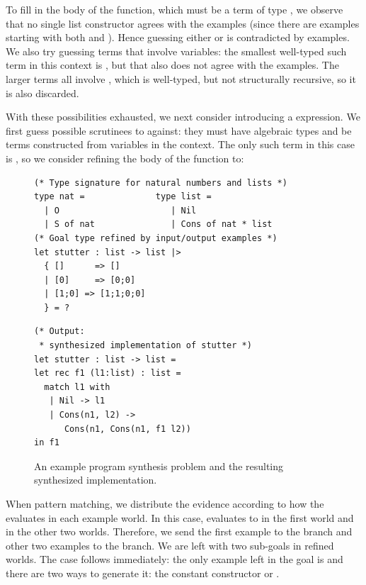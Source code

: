 To fill in the body of the function, which must be a term of type
, we observe that no single list constructor agrees with the
examples (since there are examples starting with both  and
).  Hence guessing either  or
 is contradicted by examples.
We also try guessing terms that involve variables:
the smallest well-typed such term in this context is , but that also
does not agree with the examples.  The larger terms all involve
, which is well-typed, but not structurally recursive, so it
is also discarded.

With these possibilities exhausted, we next consider introducing a
 expression.  We first guess possible scrutinees to
 against: they must have algebraic types and be terms
constructed from variables in the context.  The only such term in this
case is , so we consider refining the body of the function to:

\begin{figure}[t]

\begin{minipage}[t]{3.5in}
{\small
\begin{lstlisting}
(* Type signature for natural numbers and lists *)
type nat =              type list = 
  | O                      | Nil
  | S of nat               | Cons of nat * list
(* Goal type refined by input/output examples *)
let stutter : list -> list |>
  { []      => []
  | [0]     => [0;0]
  | [1;0] => [1;1;0;0]
  } = ?
\end{lstlisting}
}
\end{minipage}
\quad
\begin{minipage}[t]{3in}
{\small
\begin{lstlisting}
(* Output: 
 * synthesized implementation of stutter *)
let stutter : list -> list =
let rec f1 (l1:list) : list =
  match l1 with
   | Nil -> l1
   | Cons(n1, l2) -> 
      Cons(n1, Cons(n1, f1 l2))
in f1
\end{lstlisting}
}
\end{minipage}
\caption{An example program synthesis problem and the resulting
  synthesized implementation.  }
\label{fig:stutter}
\vspace{-3ex}
\end{figure}


\begin{center}
\end{center}
\noindent When pattern matching, we distribute the evidence
according to how the  evaluates in each example world.
In this case,  evaluates to  in the first world and
 in the other two worlds.  Therefore, we
send the first example to the  branch and other
two examples to the  branch.  We are left with two
sub-goals in refined worlds.  The  case follows immediately:
the only example left in the goal is  and there are two ways
to generate it: the constant  constructor or .

